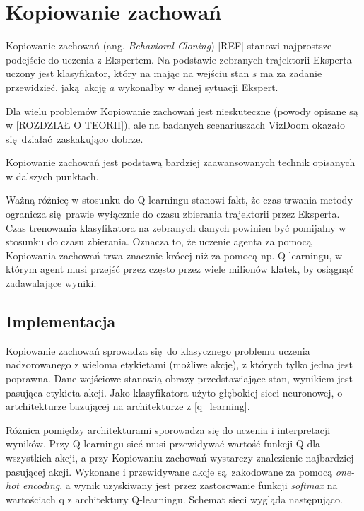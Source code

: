 \section{Kopiowanie zachowań} \label{behavioral_cloning}

Kopiowanie zachowań (ang. \textit{Behavioral Cloning}) [REF] stanowi najprostsze podejście do uczenia z Ekspertem. Na podstawie zebranych trajektorii Eksperta uczony jest klasyfikator, który na mając na wejściu stan $s$ ma za zadanie przewidzieć, jaką akcję $a$ wykonałby w danej sytuacji Ekspert.

Dla wielu problemów Kopiowanie zachowań jest nieskuteczne (powody opisane są w [ROZDZIAŁ O TEORII]), ale na badanych scenariuszach VizDoom okazało się działać zaskakująco dobrze.

Kopiowanie zachowań jest podstawą bardziej zaawansowanych technik opisanych w dalszych punktach.

Ważną różnicę w stosunku do Q-learningu stanowi fakt, że czas trwania metody ogranicza się prawie wyłącznie do czasu zbierania trajektorii przez Eksperta. Czas trenowania klasyfikatora na zebranych danych powinien być pomijalny w stosunku do czasu zbierania. Oznacza to, że uczenie agenta za pomocą Kopiowania zachowań trwa znacznie krócej niż za pomocą np. Q-learningu, w którym agent musi przejść przez często przez wiele milionów klatek, by osiągnąć zadawalające wyniki. 

\subsection{Implementacja}

Kopiowanie zachowań sprowadza się do klasycznego problemu uczenia nadzorowanego z wieloma etykietami (możliwe akcje), z których tylko jedna jest poprawna. Dane wejściowe stanowią obrazy przedstawiające stan, wynikiem jest pasująca etykieta akcji. Jako klasyfikatora użyto głębokiej sieci neuronowej, o artchitekturze bazującej na architekturze z \ref{q_learning}.

Różnica pomiędzy architekturami sporowadza się do uczenia i interpretacji wyników. Przy Q-learningu sieć musi przewidywać wartość funkcji Q dla wszystkich akcji, a przy Kopiowaniu zachowań wystarczy znalezienie najbardziej pasującej akcji. Wykonane i przewidywane akcje są zakodowane za pomocą \textit{one-hot encoding}, a wynik uzyskiwany jest przez zastosowanie funkcji \textit{softmax} na wartościach q z architektury Q-learningu. Schemat sieci wygląda następująco.

